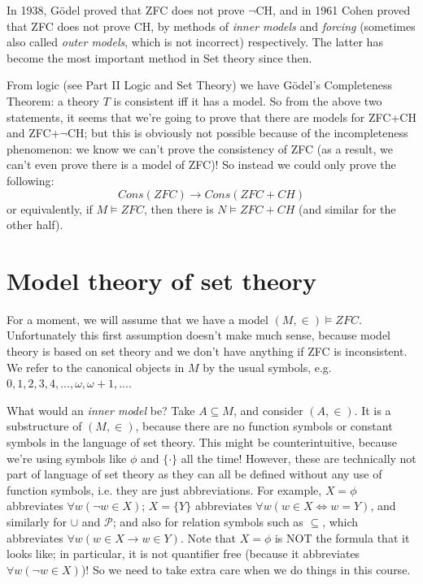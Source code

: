 \documentclass[a4paper]{article}
\begin{document}
In 1938, G\"{o}del proved that ZFC does not prove $\neg$CH, and in 1961 Cohen proved that ZFC does not prove CH, by methods of \emph{inner models} and \emph{forcing} (sometimes also called \emph{outer models}, which is not incorrect) respectively. The latter has become the most important method in Set theory since then.

From logic (see Part II Logic and Set Theory) we have G\"{o}del's Completeness Theorem: a theory $T$ is consistent iff it has a model. So from the above two statements, it seems that we're going to prove that there are models for ZFC+CH and ZFC+$\neg$CH; but this is obviously not possible because of the incompleteness phenomenon: we know we can't prove the consistency of ZFC (as a result, we can't even prove there is a model of ZFC)! So instead we could only prove the following:
$$Cons(ZFC) \to Cons(ZFC+CH)$$
or equivalently, if $M \vDash ZFC$, then there is $N \vDash ZFC+CH$ (and similar for the other half).

\newpage

\section{Model theory of set theory}
For a moment, we will assume that we have a model $(M,\in) \vDash ZFC$. Unfortunately this first assumption doesn't make much sense, because model theory is based on set theory and we don't have anything if ZFC is inconsistent. We refer to the canonical objects in $M$ by the usual symbols, e.g. $0,1,2,3,4,...,\omega,\omega+1,...$.

What would an \emph{inner model} be? Take $A \subseteq M$, and consider $(A,\in)$. It is a substructure of $(M,\in)$, because there are no function symbols or constant symbols in the language of set theory. This might be counterintuitive, because we're using symbols like $\phi$ and $\{\cdot\}$ all the time! However, these are technically not part of language of set theory as they can all be defined without any use of function symbols, i.e. they are just abbreviations. For example, $X=\phi$ abbreviates $\forall w (\neg w \in X)$; $X=\{Y\}$ abbreviates $\forall w (w \in X \iff w = Y)$, and similarly for $\cup$ and $\mathcal{P}$; and also for relation symbols such as $\subseteq$, which abbreviates $\forall w (w \in X \to w \in Y)$. Note that $X=\phi$ is NOT the formula that it looks like; in particular, it is not quantifier free (because it abbreviates $\forall w (\neg w \in X)$)! So we need to take extra care when we do things in this course.
\end{document}
